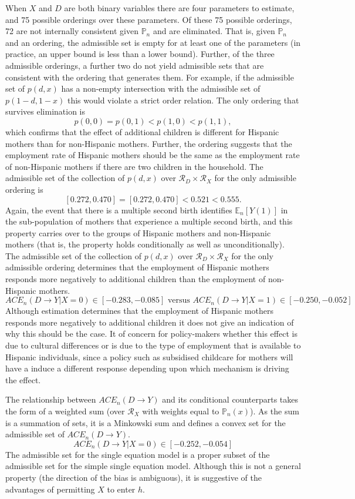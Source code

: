 \documentclass[12pt,a4paper,twoside]{article}
\numberwithin{equation}{section}
\begin{document}
When $X$ and $D$ are both binary variables there are four parameters to estimate, and 75 possible orderings over these parameters. Of these 75 possible orderings, 72 are not internally consistent given $\mathbb{P}_n$ and are eliminated. That is, given $\mathbb{P}_n$ and an ordering, the admissible set is empty for at least one of the parameters (in practice, an upper bound is less than a lower bound). Further, of the three admissible orderings, a further two do not yield admissible sets that are consistent with the ordering that generates them. For example, if the admissible set of $p(d,x)$ has a non-empty intersection with the admissible set of $p(1-d,1-x)$ this would violate a strict order relation. The only ordering that survives elimination is
\[p(0,0)=p(0,1)<p(1,0)<p(1,1),\]
which confirms that the effect of additional children is different for Hispanic mothers than for non-Hispanic mothers. Further, the ordering suggests that the employment rate of Hispanic mothers should be the same as the employment rate of non-Hispanic mothers if there are two children in the household. The admissible set of the collection of $p(d,x)$ over $\mathcal{R}_D\times\mathcal{R}_X$ for the only admissible ordering is
\[[0.272,0.470]=[0.272,0.470]<0.521<0.555.\]
Again, the event that there is a multiple second birth identifies $\mathbb{E}_n[Y(1)]$ in the sub-population of mothers that experience a multiple second birth, and this property carries over to the groups of Hispanic mothers and non-Hispanic mothers (that is, the property holds conditionally as well as unconditionally). The admissible set of the collection of $p(d,x)$ over $\mathcal{R}_D\times\mathcal{R}_X$ for the only admissible ordering determines that the employment of Hispanic mothers responds more negatively to additional children than the employment of non-Hispanic mothers.  
\[ACE_n(D\rightarrow Y|X=0)\in[-0.283,-0.085]\text{ versus }ACE_n(D\rightarrow Y|X=1)\in[-0.250,-0.052]\] 
Although estimation determines that the employment of Hispanic mothers responds more negatively to additional children it does not give an indication of why this should be the case. It of concern for policy-makers whether this effect is due to cultural differences or is due to the type of employment that is available to Hispanic individuals, since a policy such as subsidised childcare for mothers will have a induce a different response depending upon which mechanism is driving the effect.

The relationship between $ACE_n(D\rightarrow Y)$ and its conditional counterparts takes the form of a weighted sum (over $\mathcal{R}_X$ with weights equal to $\mathbb{P}_n(x)$). As the sum is a summation of sets, it is a Minkowski sum and defines a convex set for the admissible set of $ACE_n(D\rightarrow Y)$. 
\[ACE_n(D\rightarrow Y|X=0)\in[-0.252,-0.054]\]
The admissible set for the single equation model is a proper subset of the admissible set for the simple single equation model. Although this is not a general property (the direction of the bias is ambiguous), it is suggestive of the advantages of permitting $X$ to enter $h$.
\end{document}
